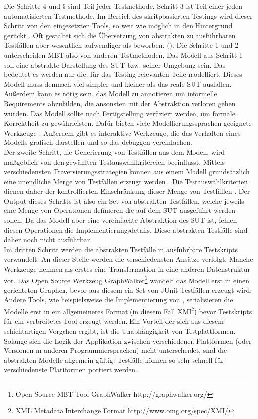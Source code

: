 Die Schritte 4 und 5 sind Teil jeder Testmethode. Schritt 3 ist Teil einer jeden automatisierten Testmethode. Im Bereich des skritpbasierten Testings wird dieser Schritt von den eingesetzten Tools, so weit wie möglich in den Hintergrund gerückt . Oft gestaltet sich die Übersetzung von abstrakten zu ausführbaren Testfällen aber wesentlich aufwendiger als beworben. ().
Die Schritte 1 und 2 unterscheiden MBT also von anderen Testmethoden. Das Modell aus Schritt 1 soll eine abstrakte Darstellung des SUT bzw. seiner Umgebung sein. Das bedeutet es werden nur die, für das Testing relevanten Teile modelliert. Dieses Modell muss demnach viel simpler und kleiner als das reale SUT ausfallen. Außerdem kann es nötig sein, das Modell zu annotieren um informelle Requirements abzubilden, die ansonsten mit der Abstraktion verloren gehen würden. Das Modell sollte nach Fertigstellung verfiziert werden, um formale Korrektheit zu gewährleisten. Dafür bieten viele Modellierungssprachen geeignete Werkzeuge \cite{kaneiwa_consistency_2006}. Außerdem gibt es interaktive Werkzeuge, die das Verhalten eines Modells grafisch darstellen und so das debuggen vereinfachen.\\
Der zweite Schritt, die Generierung von Testfällen aus dem Modell, wird maßgeblich von den gewählten Testauswahlkritereien beeinflusst. Mittels verschiedensten Traversierungsstrategien können aus einem Modell grundsätzlich eine unendliche Menge von Testfällen erzeugt werden \cite{utting_practical_2007}. Die Testauswahlkriterien dienen daher der kontrollierten Einschränkung dieser Menge von Testfällen . Der Output dieses Schritts ist also ein Set von abstrakten Testfällen, welche jeweils eine Menge von Operationen definieren die auf dem SUT ausgeführt werden sollen. Da das Modell aber eine vereinfachte Abstraktion des SUT ist, fehlen diesen Operationen die Implementierungsdetails. Diese abstrakten Testfälle sind daher noch nicht ausführbar.\\
Im dritten Schritt werden die abstrakten Testfälle in ausführbare Testskripts verwandelt. An dieser Stelle werden die verschiedensten Ansätze verfolgt. Manche Werkzeuge nehmen als erstes eine Transformation in eine anderen Datenstruktur vor. Das Open Source Werkzeug GraphWalker\footnote{Open Source MBT Tool GraphWalker http://graphwalker.org/} wandelt das Modell erst in einen gerichteten Graphen, bevor aus diesem ein Set von JUnit-Testfällen erzeugt wird. Andere Tools, wie beispielsweise die Implementierung von \cite{pinheiro_model-based_2013}, serialisieren die Modelle erst in ein allgemeineres Format (in diesem Fall XMI\footnote{XML Metadata Interchange Format http://www.omg.org/spec/XMI/}) bevor Testskripts für ein verbreitetes Tool erzeugt werden. Ein Vorteil der sich aus diesem schichtartigen Vorgehen ergibt, ist die Unabhängigkeit von Testplattformen. Solange sich die Logik der Applikation zwischen verschiedenen Plattformen (oder Versionen in anderen Programmiersprachen) nicht unterscheidet, sind die abstrakten Modelle allgemein gültig. Testfälle können so sehr schnell für verschiedenste Plattformen portiert werden.\\

